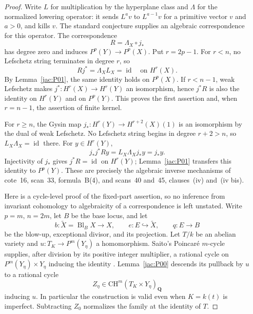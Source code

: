 \documentclass[11pt,a4paper]{article}
\begin{document}
\begin{proof}
Write $L$ for multiplication by the hyperplane class and $\Lambda$
for the normalized lowering operator: it sends $L^a v$ to
$L^{a-1}v$ for a primitive vector $v$ and $a>0$, and kills $v$.
The standard conjecture supplies an algebraic correspondence for this
operator.  The correspondence
\[
 R=\Lambda_X\circ j_*
\]
has degree zero and induces $P^p(Y)\to P^p(X)$.
Put $r=2p-1$.
For $r<n$, no Lefschetz string terminates in degree $r$, so
\[
 Rj^*=\Lambda_X L_X=\operatorname{id}\quad\text{on }H^r(X).
\]
By Lemma~\ref{jac:P01}, the same identity holds on $P^p(X)$.
If $r<n-1$, weak Lefschetz makes $j^*:H^r(X)\to H^r(Y)$ an
isomorphism, hence $j^*R$ is also the identity on $H^r(Y)$ and on
$P^p(Y)$.  This proves the first assertion and, when $r=n-1$,
the assertion of finite kernel.

For $r\ge n$, the Gysin map
$j_*:H^r(Y)\to H^{r+2}(X)(1)$ is an isomorphism by the dual of
weak Lefschetz.  No Lefschetz string begins in degree $r+2>n$,
so $L_X\Lambda_X=\operatorname{id}$ there.  For $y\in H^r(Y)$,
\[
 j_*j^*Ry=L_X\Lambda_Xj_*y=j_*y.
\]
Injectivity of $j_*$ gives $j^*R=\operatorname{id}$ on $H^r(Y)$;
Lemma~\ref{jac:P01} transfers this identity to $P^p(Y)$.
These are precisely the algebraic inverse mechanisms of cote~16,
scan~33, formula~B(4), and scans~40 and~45, clauses~(iv) and~(iv bis).

Here is a cycle-level proof of the fixed-part assertion, so no inference
from invariant cohomology to algebraicity of a correspondence is left
unstated.  Write $p=m$, $n=2m$, let $B$ be the base locus, and let
\[
 b:\widetilde X=\operatorname{Bl}_B X\longrightarrow X,
 \qquad e:E\hookrightarrow\widetilde X,
 \qquad q:E\longrightarrow B
\]
be the blow-up, exceptional divisor, and its projection.  Let $T/k$
be an abelian variety and
$u:T_K\longrightarrow P^m(Y_\eta)$ a homomorphism.  Saito's
Poincar\'e $m$-cycle supplies, after division by its positive integer
multiplier, a rational cycle on $P^m(Y_\eta)\times Y_\eta$
inducing the identity \cite[\S4.1]{Saito1979}.  Lemma~\ref{jac:P00}
descends its pullback by $u$ to a rational cycle
\[
 Z_\eta\in\mathrm{CH}^m(T_K\times Y_\eta)_{\mathbf Q}
\]
inducing $u$.  In particular the construction is valid even when
$K=k(t)$ is imperfect.  Subtracting $Z_0$ normalizes
the family at the identity of $T$.


\end{proof}
\end{document}
